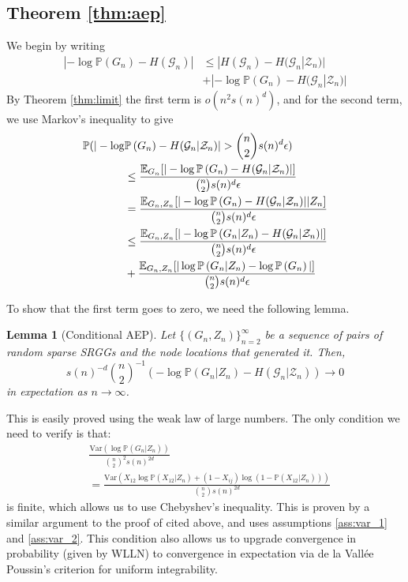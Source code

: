 \documentclass[conference,letterpaper]{IEEEtran}
\newtheorem{lemma}{Lemma}
\newcommand{\tti}{\rightarrow\infty}
\newcommand{\graph}{\mathcal{G}}
\newcommand{\prob}[1]{\mathbb{P}\left(#1\right)}
\newcommand{\Var}{\text{Var}}
\begin{document}
\subsection{Theorem \ref{thm:aep}}

We begin by writing
\begin{align}
    |-\log \prob{G_n} - H(\graph_n)| &\leq |H(\graph_n) - H(\graph_n|\mathcal{Z}_n)| \nonumber \\ &+ |-\log \prob{G_n} - H(\graph_n | \mathcal{Z}_n)| \nonumber 
\end{align}
By Theorem \ref{thm:limit} the first term is $o(n^2s(n)^d)$, and for the second term, we use Markov's inequality to give
\begin{align}
    \mathbb{P}(|-\log\space &\prob{G_n} - H(\graph_n|\mathcal{Z}_n)| > \binom{n}{2}s(n)^d\epsilon) \nonumber \\&\leq \frac{\mathbb{E}_{G_n}[|-\log \prob{G_n} - H(\graph_n|\mathcal{Z}_n)|]}{\binom{n}{2}s(n)^d\epsilon} \nonumber \\
    &= \frac{\mathbb{E}_{G_n,Z_n}[|-\log \prob{G_n} - H(\graph_n|\mathcal{Z}_n)| | Z_n]}{\binom{n}{2}s(n)^d\epsilon} \nonumber \\ 
    \label{eq:split_bound}
    &\leq \frac{\mathbb{E}_{G_n,Z_n}[|-\log \prob{G_n|Z_n} - H(\graph_n|\mathcal{Z}_n)|]}{\binom{n}{2}s(n)^d\epsilon} \nonumber \\ &+ \frac{\mathbb{E}_{G_n,Z_n}[|\log \prob{G_n|Z_n} - \log \prob{G_n}|]}{\binom{n}{2}s(n)^d\epsilon}
\end{align}

To show that the first term goes to zero, we need the following lemma.
\begin{lemma}[Conditional AEP]
    \label{thm:conditional_aep}
    Let $\{(G_n,Z_n)\}_{n=2}^\infty$ be a sequence of pairs of random sparse SRGGs and the node locations that generated it. Then,
    \begin{equation}
        s(n)^{-d}\binom{n}{2}^{-1}\left(-\log \prob{G_n|Z_n} - H(\graph_n|\mathcal{Z}_n)\right) \to 0
    \end{equation}
    in expectation as $n\tti$.
\end{lemma}

 This is easily proved using the weak law of large numbers. The only condition we need to verify is that:
\begin{align*}
    &\frac{\Var(\log \prob{G_n|Z_n})}{\binom{n}{2}^2s(n)^{2d}} \nonumber \\ &= \frac{\Var(X_{12}\log \prob{X_{12}|Z_n}+ (1-X_{ij})\log(1-\mathbb{P}(X_{12}|Z_n)))}{\binom{n}{2}s(n)^{2d}}
\end{align*}
is finite, which allows us to use Chebyshev's inequality. This is proven by a similar argument to the proof of \cite[Theorem 1]{baker2026entropy} cited above, and uses assumptions \eqref{ass:var_1} and \eqref{ass:var_2}. This condition also allows us to upgrade convergence in probability (given by WLLN) to convergence in expectation via de la Vall\'ee Poussin's criterion for uniform integrability.
\end{document}

